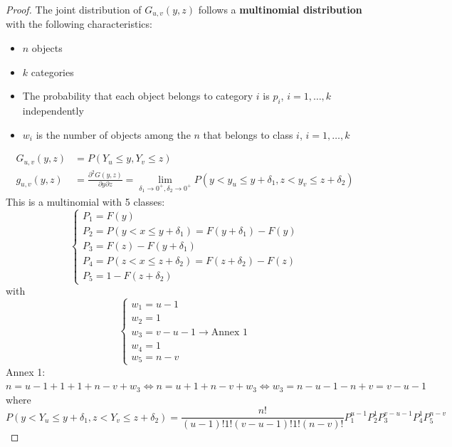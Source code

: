 \begin{proof}
    The joint distribution of $G_{u,v}(y,z)$ follows a \textbf{multinomial distribution} with the following characteristics:
    \begin{itemize}
        \item $n$ objects
        \item $k$ categories
        \item The probability that each object belongs to category $i$ is $p_i$, $i=1,\ldots,k$ independently
        \item $w_i$ is the number of objects among the $n$ that belongs to class $i$, $i=1,\ldots,k$
    \end{itemize}
    \begin{align*}
        G_{u,v}(y,z) & = P(Y_u\leq y, Y_v\leq z)\\
        g_{u,v}(y,z) & = \frac{\partial^2 G(y,z)}{\partial y\partial z} = \lim_{\delta_1\to0^+,\delta_2\to0^+}P(y<y_u\leq y+\delta_1, z<y_v\leq z+\delta_2)
    \end{align*}
    This is a multinomial with 5 classes:
    \begin{equation*}
        \begin{cases*}
            P_1 = F(y)\\
            P_2 = P(y<x\leq y+\delta_1) = F(y+\delta_1)-F(y)\\
            P_3 = F(z)-F(y+\delta_1)\\
            P_4 = P(z<x\leq z+\delta_2) = F(z+\delta_2)-F(z)\\
            P_5 = 1-F(z+\delta_2)
        \end{cases*}
    \end{equation*}
    with \begin{equation*}
        \begin{cases*}
            w_1 = u-1\\
            w_2 = 1\\
            w_3 = v-u-1\to\text{Annex 1}\\
            w_4 = 1\\
            w_5 = n-v
        \end{cases*}
    \end{equation*}
    Annex 1: $n = u-1+1+1+n-v+w_3\Leftrightarrow n=u+1+n-v+w_3\Leftrightarrow w_3=n-u-1-n+v=v-u-1$\\
    where \begin{equation*}
        P(y<Y_u\leq y+\delta_1, z<Y_v\leq z+\delta_2) = \frac{n!}{(u-1)!1!(v-u-1)!1!(n-v)!}P_1^{u-1}P_2^1 P_3^{v-u-1} P_4^1 P_5^{n-v}

\end{equation*}
\end{proof}
